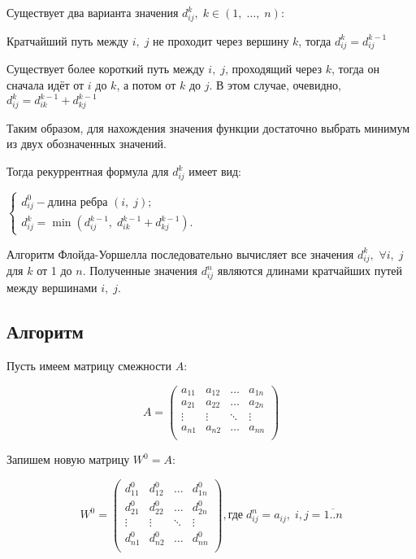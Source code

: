 \documentclass{article}
\newenvironment{itemize*}%
	{\begin{itemize}[topsep=0pt, partopsep=0pt, itemsep=0pt,parsep=0pt]}	
	{\end{itemize}}
\begin{document}
	Существует два варианта значения \(d_{i j}^{k},\;k \in (1,\;\ldots,\;n)\):
	\begin{itemize*}
		\item Кратчайший путь между \(i,\;j\) не проходит через вершину \(k\), тогда \(d_{i j}^{k}=d_{i j}^{k-1}\)
		\item Существует более короткий путь между \(i,\;j\), проходящий через \(k\), тогда он сначала идёт от \(i\) до \(k\), а потом от \(k\) до \(j\). В этом случае, очевидно, \(d_{i j}^{k}=d_{i k}^{k-1} + d_{k j}^{k-1}\)
	\end{itemize*}
	
	Таким образом, для нахождения значения функции достаточно выбрать минимум из двух обозначенных значений.
	
	Тогда рекуррентная формула для \(d_{i j}^k\) имеет вид:
	
	\(
		\left\{
			\begin{array}{ll}
				d_{i j}^0 - \mbox{длина ребра } (i,\;j); \\
				d_{i j}^{k} = \min (d_{i j}^{k-1},\; d_{i k}^{k-1} + d_{k j}^{k-1}).
			\end{array}
		\right.
	\)
	
	Алгоритм Флойда-Уоршелла последовательно вычисляет все значения \(d_{i j}^{k},\) \(\forall i,\; j\) для \(k\) от 1 до \(n\). Полученные значения \(d_{i j}^{n}\) являются длинами кратчайших путей между вершинами \(i,\; j.\)
	
	\subsection{Алгоритм}
	
		Пусть имеем матрицу смежности $A$:
		
		\begin{displaymath}
			A =
			\left(
				\begin{array}{cccc}
					a_{11} & a_{12} & \dots  & a_{1n} \\
					a_{21} & a_{22} & \dots  & a_{2n} \\
					\vdots & \vdots & \ddots & \vdots \\
					a_{n1} & a_{n2} & \dots  & a_{nn} \\
				\end{array} 
			\right)
		\end{displaymath}
		
		Запишем новую матрицу $W^0 = A$:
		
		\begin{displaymath}
			W^0 =
			\left(
				\begin{array}{cccc}
					d_{11}^{0} & d_{12}^{0} & \dots  & d_{1n}^{0} \\
					d_{21}^{0} & d_{22}^{0} & \dots  & d_{2n}^{0} \\
					\vdots     & \vdots     & \ddots & \vdots     \\
					d_{n1}^{0} & d_{n2}^{0} & \dots  & d_{nn}^{0} \\
				\end{array} 
			\right), \mbox{где}\; d_{ij}^{n} = a_{ij},\;i,j=\overline{1..n}
		\end{displaymath}
		
\end{document}
